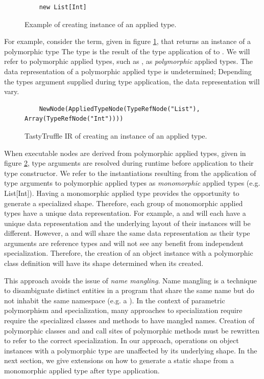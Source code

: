 \begin{figure}[!htb]
	\begin{verbatim}
	new List[Int]
	\end{verbatim}
	\caption{Example of creating instance of an applied type.}
	\label{example:applied-type}
\end{figure}

For example, consider the term, given in figure \ref{example:applied-type}, that returns an instance of a polymorphic type
The type  is the result of the type application of  to .
We will refer to polymorphic applied types, such as , as \textit{polymorphic} applied types. 
The data representation of a polymorphic applied type is undetermined; Depending the types argument supplied during type application, the data representation will vary.

\begin{figure}[!htb]
	\begin{verbatim}
	NewNode(AppliedTypeNode(TypeRefNode("List"), Array(TypeRefNode("Int"))))
	\end{verbatim}
	\caption{TastyTruffle IR of creating an instance of an applied type.}
	\label{example:applied-type-node}
\end{figure}

When executable nodes are derived from polymorphic applied types, given in figure \ref{example:applied-type-node}, type arguments are resolved during runtime before application to their type constructor.
We refer to the instantiations resulting from the application of type arguments to polymorphic applied types as \textit{monomorphic} applied types (e.g. List[Int]).
Having a monomorphic applied type provides the opportunity to generate a specialized shape.
Therefore, each group of monomorphic applied types have a unique data representation.
For example, a  and  will each have a unique data representation and the underlying layout of their instances will be different.
However, a  and  will share the same data representation as their type arguments are reference types and will not see any benefit from independent specialization.
Therefore, the creation of an object instance with a polymorphic class definition will have its shape determined when its created.

This approach avoids the issue of \textit{name mangling}.
Name mangling is a technique to disambiguate distinct entities in a program that share the same name but do not inhabit the same namespace (e.g. a ).
In the context of parametric polymorphism and specialization, many approaches to specialization require require the specialized classes and methods to have mangled names.
Creation of polymorphic classes and and call sites of polymorphic methods must be rewritten to refer to the correct specialization.
In our approach, operations on object instances with a polymorphic type are unaffected by its underlying shape.
In the next section, we give extensions on how to generate a static shape from a monomorphic applied type after type application.

